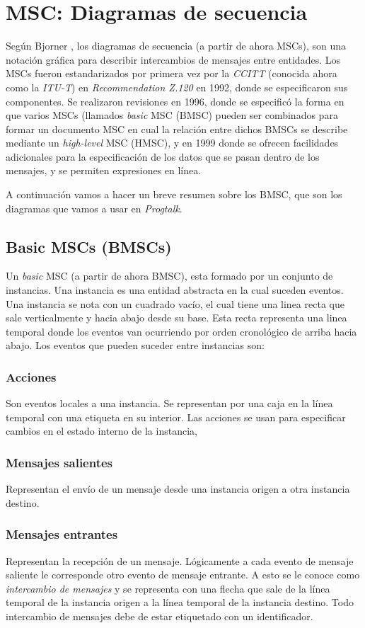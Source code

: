 \chapter{MSC: Diagramas de secuencia}
\label{ch:msc}

Según Bjorner \cite{bjorner}, los diagramas de secuencia (a partir de
ahora MSCs), son una notación gráfica para describir intercambios de
mensajes entre entidades. Los MSCs fueron estandarizados por primera
vez por la \textit{CCITT} (conocida ahora como la \textit{ITU-T}) en
\textit{Recommendation Z.120} en 1992, donde se especificaron sus
componentes. Se realizaron revisiones en 1996, donde se especificó la
forma en que varios MSCs (llamados \textit{basic} MSC (BMSC) pueden
ser combinados para formar un documento MSC en cual la relación entre
dichos BMSCs se describe mediante un \textit{high-level} MSC (HMSC), y
en 1999 donde se ofrecen facilidades adicionales para la
especificación de los datos que se pasan dentro de los mensajes, y se
permiten expresiones en línea.

A continuación vamos a hacer un breve resumen sobre los BMSC, que son
los diagramas que vamos a usar en \textit{Progtalk}.

\section{Basic MSCs (BMSCs)}
Un \textit{basic} MSC (a partir de ahora BMSC), esta formado por un
conjunto de instancias. Una instancia es una entidad abstracta en la
cual suceden eventos. Una instancia se nota con un cuadrado vacío, el
cual tiene una linea recta que sale verticalmente y hacia abajo desde
su base. Esta recta representa una linea temporal donde los eventos
van ocurriendo por orden cronológico de arriba hacia abajo. Los
eventos que pueden suceder entre instancias son:

\subsection*{Acciones}
Son eventos locales a una instancia. Se representan por una caja en la
línea temporal con una etiqueta en su interior. Las acciones se usan
para especificar cambios en el estado interno de la instancia,
\subsection*{Mensajes salientes} 
Representan el envío de un mensaje desde una instancia origen a otra
instancia destino.
\subsection*{Mensajes entrantes}
Representan la recepción de un mensaje. Lógicamente a cada evento de
mensaje saliente le corresponde otro evento de mensaje entrante. A
esto se le conoce como \textit{intercambio de mensajes} y se representa con una
flecha que sale de la línea temporal de la instancia origen a la
línea temporal de la instancia destino. Todo intercambio de mensajes
debe de estar etiquetado con un identificador.


